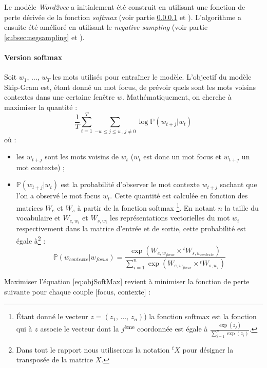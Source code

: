 \documentclass[11pt,french,french]{article}
\let\rmarkdownfootnote\footnote%
\def\footnote{\protect\rmarkdownfootnote}
\begin{document}
Le modèle \emph{Word2vec} a initialement été construit en utilisant une fonction de perte dérivée de la fonction \emph{softmax} (voir partie \ref{subsec:softmax} et \cite{Mikolov}). L'algorithme a ensuite été amélioré en utilisant le \emph{negative sampling} (voir partie \ref{subsec:negsampling} et \cite{MikolovNS}).

\hypertarget{subsec:softmax}{%
\paragraph{Version softmax}\label{subsec:softmax}}

Soit \(w_1,\,\dots,\,w_T\) les mots utilisés pour entraîner le modèle. L'objectif du modèle Skip-Gram est, étant donné un mot focus, de prévoir quels sont les mots voisins contextes dans une certaine fenêtre \(w\). Mathématiquement, on cherche à maximiser la quantité :
\begin{equation}
\frac 1 T\sum_{t=1}^T\sum_{-w\leq j \leq w,\,j\ne 0} \log \mathbb P(w_{t+j}\vert w_{t})
\label{eq:objSoftMax}
\end{equation}
où :

\begin{itemize}
\item
  les \(w_{t+j}\) sont les mots voisins de \(w_t\) (\(w_t\) est donc un mot focus et \(w_{t+j}\) un mot contexte) ;
\item
  \(\mathbb P(w_{t+j}\vert w_{t})\) est la probabilité d'observer le mot contexte \(w_{t+j}\) sachant que l'on a observé le mot focus \(w_t\).
  Cette quantité est calculée en fonction des matrices \(W_e\) et \(W_s\) à partir de la fonction softmax
  \footnote{Étant donné le vecteur \(z=(z_1,\,\dots,\,z_n)\)) la fonction softmax est la fonction qui à \(z\) associe le vecteur dont la \(j\)\textsuperscript{ème} coordonnée est égale à \(\frac{\exp(z_j)}{\sum_{i=1}^n\exp(z_i)}\).}. En notant \(n\) la taille du vocabulaire et \(W_{e,w_i}\) et \(W_{s,w_i}\) les représentations vectorielles du mot \(w_i\) respectivement dans la matrice d'entrée et de sortie, cette probabilité est égale à\footnote{Dans tout le rapport nous utiliserons la notation \(^{t}X\) pour désigner la transposée de la matrice \(X\).} :
  \[
  \mathbb P(w_{contexte}\vert w_{focus}) = 
  \frac{
  \exp(W_{e,w_{focus}}\times {}^tW_{s,w_{contexte}})
  }{
  \sum_{i=1}^n\exp(W_{e,w_{focus}}\times {}^tW_{s,w_{i}})
  }
  \]
\end{itemize}

Maximiser l'équation \eqref{eq:objSoftMax} revient à minimiser la fonction de perte suivante pour chaque couple {[}focus, contexte{]} :
\end{document}
